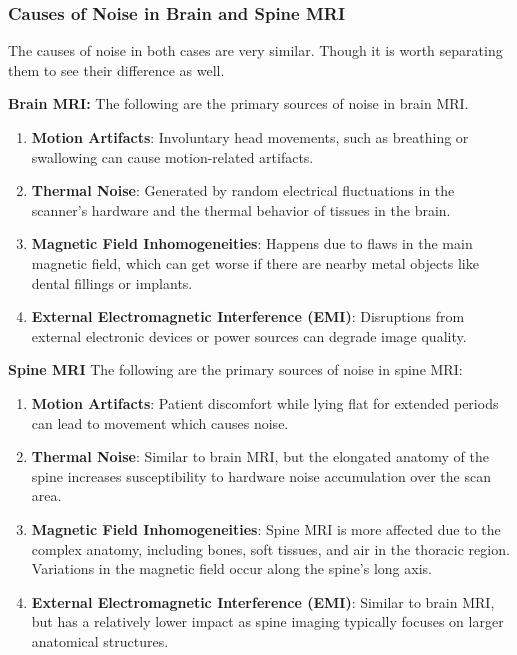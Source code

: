\documentclass[hidelinks,12pt]{article}
\begin{document}
	\subsubsection{Causes of Noise in Brain and Spine MRI}
	
	The causes of noise in both cases are very similar. Though it is worth separating them to see their difference as well.
	
	 \textbf{Brain MRI:}
	The following are the primary sources of noise in brain MRI.
	
	\begin{enumerate}
		\item \textbf{Motion Artifacts}: Involuntary head movements, such as breathing or swallowing can cause motion-related artifacts.
		
		\item \textbf{Thermal Noise}: Generated by random electrical fluctuations in the scanner's hardware and the thermal behavior of tissues in the brain.
		
		\item \textbf{Magnetic Field Inhomogeneities}: Happens due to flaws in the main magnetic field, which can get worse if there are nearby metal objects like dental fillings or implants.
		
		\item \textbf{External Electromagnetic Interference (EMI)}: Disruptions from external electronic devices or power sources can degrade image quality.
	\end{enumerate}
	
	 \textbf{Spine MRI}
	The following are the primary sources of noise in spine MRI:
	
	\begin{enumerate}
		\item \textbf{Motion Artifacts}: Patient discomfort while lying flat for extended periods can lead to movement which causes noise.
		
		\item \textbf{Thermal Noise}: Similar to brain MRI, but the elongated anatomy of the spine increases susceptibility to hardware noise accumulation over the scan area.
		
		\item \textbf{Magnetic Field Inhomogeneities}: Spine MRI is more affected due to the complex anatomy, including bones, soft tissues, and air in the thoracic region. Variations in the magnetic field occur along the spine's long axis.
		
		\item \textbf{External Electromagnetic Interference (EMI)}: Similar to brain MRI, but has a relatively lower impact as spine imaging typically focuses on larger anatomical structures.
	\end{enumerate}
	
\end{document}
